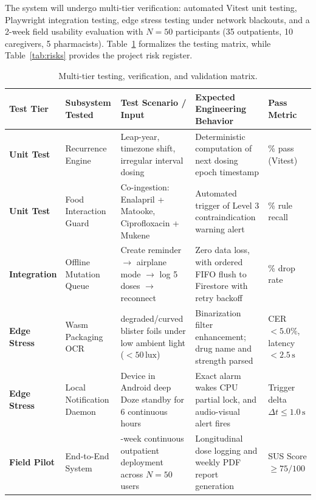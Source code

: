 The system will undergo multi-tier verification: automated Vitest unit testing, Playwright integration testing, edge stress testing under network blackouts, and a 2-week field usability evaluation with $N=50$ participants (35 outpatients, 10 caregivers, 5 pharmacists). Table~\ref{tab:test_verification_matrix} formalizes the testing matrix, while Table~\ref{tab:risks} provides the project risk register.

\begin{table}[!htbp]
  \centering
  \caption{Multi-tier testing, verification, and validation matrix.}
  \label{tab:test_verification_matrix}
  \scriptsize
  \setlength{\tabcolsep}{3pt}
  \begin{tabularx}{\textwidth}{@{} l >{\raggedright\arraybackslash}p{2.0cm} >{\raggedright\arraybackslash}p{2.8cm} >{\raggedright\arraybackslash}X >{\centering\arraybackslash}p{1.8cm} @{}}
    \toprule
    \textbf{Test Tier} & \textbf{Subsystem Tested} & \textbf{Test Scenario / Input} & \textbf{Expected Engineering Behavior} & \textbf{Pass Metric} \\
    \midrule
    \textbf{Unit Test} & Recurrence Engine & Leap-year, timezone shift, irregular interval dosing & Deterministic computation of next dosing epoch timestamp & 100\% pass (Vitest) \\
    \midrule
    \textbf{Unit Test} & Food Interaction Guard & Co-ingestion: Enalapril + Matooke, Ciprofloxacin + Mukene & Automated trigger of Level 3 contraindication warning alert & 100\% rule recall \\
    \midrule
    \textbf{Integration} & Offline Mutation Queue & Create reminder $\to$ airplane mode $\to$ log 5 doses $\to$ reconnect & Zero data loss, with ordered FIFO flush to Firestore with retry backoff & 0\% drop rate \\
    \midrule
    \textbf{Edge Stress} & Wasm Packaging OCR & 100 degraded/curved blister foils under low ambient light ($<50\,\text{lux}$) & Binarization filter enhancement; drug name and strength parsed & CER $< 5.0\%$, latency $<2.5\,\text{s}$ \\
    \midrule
    \textbf{Edge Stress} & Local Notification Daemon & Device in Android deep Doze standby for 6 continuous hours & Exact alarm wakes CPU partial lock, and audio-visual alert fires & Trigger delta $\Delta t \le 1.0\,\text{s}$ \\
    \midrule
    \textbf{Field Pilot} & End-to-End System & 2-week continuous outpatient deployment across $N=50$ users & Longitudinal dose logging and weekly PDF report generation & SUS Score $\ge 75/100$ \\
    \bottomrule
  \end{tabularx}
\end{table}

